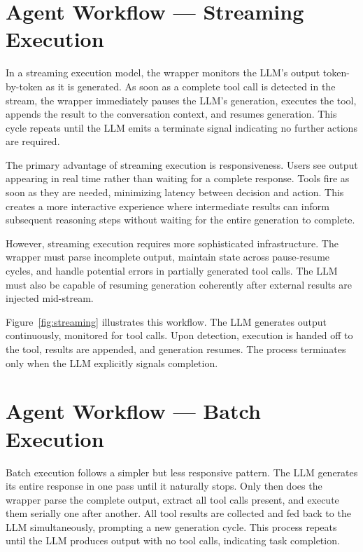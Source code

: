 
\section{Agent Workflow --- Streaming Execution}\label{sec:streaming}

In a streaming execution model, the wrapper monitors the LLM's output token-by-token as it is generated. As soon as a complete tool call is detected in the stream, the wrapper immediately pauses the LLM's generation, executes the tool, appends the result to the conversation context, and resumes generation. This cycle repeats until the LLM emits a terminate signal indicating no further actions are required.

The primary advantage of streaming execution is responsiveness. Users see output appearing in real time rather than waiting for a complete response. Tools fire as soon as they are needed, minimizing latency between decision and action. This creates a more interactive experience where intermediate results can inform subsequent reasoning steps without waiting for the entire generation to complete.

However, streaming execution requires more sophisticated infrastructure. The wrapper must parse incomplete output, maintain state across pause-resume cycles, and handle potential errors in partially generated tool calls. The LLM must also be capable of resuming generation coherently after external results are injected mid-stream.

Figure~\ref{fig:streaming} illustrates this workflow. The LLM generates output continuously, monitored for tool calls. Upon detection, execution is handed off to the tool, results are appended, and generation resumes. The process terminates only when the LLM explicitly signals completion.

\section{Agent Workflow --- Batch Execution}\label{sec:batch}

Batch execution follows a simpler but less responsive pattern. The LLM generates its entire response in one pass until it naturally stops. Only then does the wrapper parse the complete output, extract all tool calls present, and execute them serially one after another. All tool results are collected and fed back to the LLM simultaneously, prompting a new generation cycle. This process repeats until the LLM produces output with no tool calls, indicating task completion.

